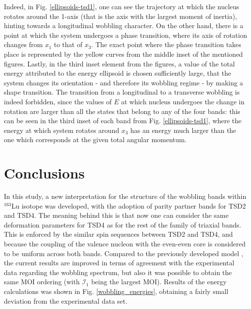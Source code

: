 \documentclass[%
 reprint,
 amsmath,
 amssymb,
 aps,
 floatfix,
]{revtex4-2}
\begin{document}
Indeed, in Fig. \ref{ellipsoids-tsd1}, one can see the trajectory at which the nucleus rotates around the 1-axis (that is the axis with the largest moment of inertia), hinting towards a longitudinal wobbling character. On the other hand, there is a point at which the system undergoes a phase transition, where its axis of rotation changes from $x_1$ to that of $x_3$. The exact point where the phase transition takes place is represented by the yellow curves from the middle inset of the mentioned figures. Lastly, in the third inset element from the figures, a value of the total energy attributed to the energy ellipsoid is chosen sufficiently large, that the system changes its orientation - and therefore its wobbling regime - by making a shape transition. The transition from a longitudinal to a transverse wobbling is indeed forbidden, since the values of $E$ at which nucleus undergoes the change in rotation are larger than all the states that belong to any of the four bands: this can be seen in the third inset of each band from Fig. \ref{ellipsoids-tsd1}, where the energy at which system rotates around $x_3$ has an energy much larger than the one which corresponds at the given total angular momentum.

\section{Conclusions}

In this study, a new interpretation for the structure of the wobbling bands within $^{163}$Lu isotope was developed, with the adoption of parity partner bands for TSD2 and TSD4. The meaning behind this is that now one can consider the same deformation parameters for TSD4 as for the rest of the family of triaxial bands. This is enforced by the similar spin sequences between TSD2 and TSD4, and because the coupling of the valence nucleon with the even-even core is considered to be uniform across both bands. Compared to the previously developed model \cite{raduta2020new}, the current results are improved in terms of agreement with the experimental data regarding the wobbling spectrum, but also it was possible to obtain the same MOI ordering (with $\mathcal{I}_1$ being the largest MOI). Results of the energy calculations was shown in Fig. \ref{wobbling_energies}, obtaining a fairly small deviation from the experimental data set.
\end{document}
